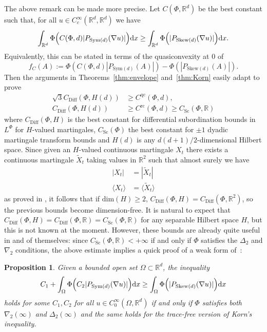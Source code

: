 \documentclass[11pt, a4paper]{amsart}
\newtheorem{proposition}{Proposition}[section]
\theoremstyle{definition}
\theoremstyle{remark}
\newcommand{\R}{\mathbb{R}}
\begin{document}
The above remark can be made more precise.
Let $C(\Phi, \R^d)$
be the best constant such that,
for all $u\in C^\infty_c(\R^d, \R^d)$
we have
\begin{equation*}
\int_{\R^d}\Phi\Bigl(
C(\Phi,d) |P_{\mathrm{Sym}(d)}(\nabla u)|
\Bigr)
\mathrm{d}x
\ge \int_{\R^d} \Phi\Bigl(
|P_{\mathrm{Skew}(d)}(\nabla u)|
\Bigr)\mathrm{d}x.
\end{equation*}
Equivalently, this can be stated
in terms of the quasiconvexity
at $0$ of
\[
f_C(A):=\Phi(C(\Phi,d) |P_{\mathrm{Sym}(d)}(A)|)-
\Phi(|P_{\mathrm{Skew}(d)}(A)|).
\]
Then the arguments in Theorems~\ref{thm:envelope}
and~\ref{thm:Korn} easily adapt to prove 
\begin{align*}
\sqrt 3 C_{\mathrm{Diff}}(\Phi, H(d))
&\ge C^{\mathrm{qc}}(\Phi,d),\\ 
C_{\mathrm{Diff}}(\Phi, H(d))
&\ge C^{\mathrm{rc}}(\Phi,d)\ge 
C_{\mathrm{Sc}}(\Phi, \mathbb{R})
\end{align*}
where $C_{\mathrm{Diff}}(\Phi, H)$
is the best constant for differential
subordination bounds in $L^\Phi$
for $H$-valued martingales,
$C_{\mathrm{Sc}}(\Phi)$ the
best constant for $\pm1$ dyadic
martingale transform bounds and 
$H(d)$ is any $d(d+1)/2$-dimensional Hilbert space.
Since given an $H$-valued
continuous martingale $X_t$
there exists a continuous martingale $\tilde X_t$ taking values in $\R^2$
such that almost surely we 
have
\begin{align*}
    |X_t|&=|\tilde X_t|\\
    \langle X_t\rangle&=\langle \tilde X_t\rangle
\end{align*}
as proved in \cite{KallenbergSztencel},
it follows that if $\mathrm{dim}(H)\ge 2$,
$C_{\mathrm{Diff}}(\Phi, H)=
C_{\mathrm{Diff}}(\Phi, \R^2)$, so the previous bounds become dimension-free.
It is natural to expect that
$C_{\mathrm{Diff}}(\Phi, H)=
C_{\mathrm{Diff}}(\Phi, \R)=C_{\mathrm{Sc}}(\Phi, \R)$
for any
separable Hilbert space $H$, but this is not known at the moment.
However, these bounds are already quite
useful in and of themselves:
since $C_{\mathrm{Sc}}(\Phi, \R)<+\infty$
if and only if $\Phi$ satisfies the
$\Delta_2$ and $\nabla_2$ conditions, 
the above estimate implies a quick proof of a weak
form of~\cite{Breit2011}:
\begin{proposition}
Given a bounded open set $\Omega\subset \mathbb R^d$,
the inequality 
\begin{equation}\label{eq:KornOrlicz}
C_1+\int_{\Omega}\Phi\Bigl(
C_2 |P_{\mathrm{Sym}(d)}(\nabla u)|\Bigr)
\mathrm{d}x
\ge \int_{\Omega} \Phi\Bigl(
|P_{\mathrm{Skew}(d)}(\nabla u)|\Bigr)
\mathrm{d}x
\end{equation}
holds for some $C_1,C_2$
for all $u\in C^\infty_0(\Omega, \R^d)$ if and only if 
$\Phi$ satisfies both $\nabla_2(\infty)$
and $\Delta_2(\infty)$
and the same holds for the trace-free
version of Korn's inequality.
\end{proposition}
\end{document}
